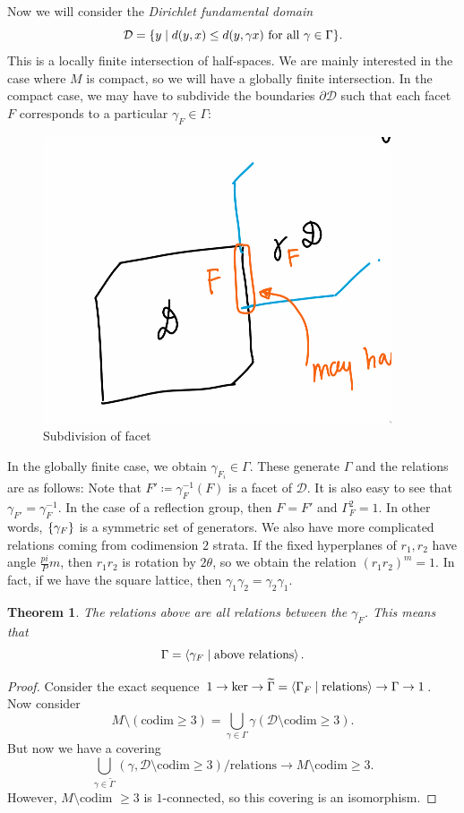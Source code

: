\documentclass[leqno, openany]{memoir}
\newtheorem{thm}{Theorem}[section]
\theoremstyle{definition}
\theoremstyle{remark}
\theoremstyle{plain}
\theoremstyle{definition}
\theoremstyle{remark}
\newcommand{\mc}[1]{\mathcal{#1}}
\newcommand{\wtl}[1]{\widetilde{#1}}
\begin{document}
Now we will consider the \textit{Dirichlet fundamental domain} \[ \mc{D} =
\qty{y \mid d(y,x) \leq d(y, \gamma x) \text{ for all } \gamma \in \Gamma}. \]
This is a locally finite intersection of half-spaces. We are mainly interested
in the case where $M$ is compact, so we will have a globally finite
intersection. In the compact case, we may have to subdivide the boundaries
$\partial \mc{D}$ such that each facet $F$ corresponds to a particular
$\gamma_F \in \Gamma$: \begin{figure}[H] \centering
    \includegraphics[scale=0.5]{fd_domain.png} \caption{Subdivision of facet}%
\label{fig:fd_domain} \end{figure} In the globally finite case, we obtain
$\gamma_{F_i} \in \Gamma$. These generate $\Gamma$ and the relations are as
follows: Note that $F' \coloneqq \gamma_F^{-1}(F)$ is a facet of $\mc{D}$. It
is also easy to see that $\gamma_{F'} = \gamma_F^{-1}$. In the case of a
reflection group, then $F = F'$ and $\Gamma_F^2 = 1$. In other words,
$\qty{\gamma_F}$ is a symmetric set of generators. We also have more
complicated relations coming from codimension $2$ strata. If the fixed
hyperplanes of $r_1, r_2$ have angle $\frac{pi}Pm$, then $r_1 r_2$ is rotation
by $2 \theta$, so we obtain the relation ${(r_1 r_2)}^m = 1$. In fact, if we
have the square lattice, then $\gamma_1 \gamma_2 = \gamma_2 \gamma_1$.

\begin{thm} The relations above are all relations between the $\gamma_F$. This
    means that \[ \Gamma = \ev{\gamma_F \mid \text{above relations}}. \]
\end{thm}

\begin{proof} Consider the exact sequence $1 \to \ker \to \wtl{\Gamma} =
    \ev{\Gamma_F \mid \text{relations}} \to \Gamma \to 1$. Now consider \[ M
    \setminus ( \text{codim}\geq 3 ) = \bigcup_{\gamma \in \Gamma}
\gamma(\mc{D} \setminus \text{codim} \geq 3). \] But now we have a covering \[
\bigcup_{\gamma \in \wtl{\Gamma}} (\gamma, \mc{D} \setminus \text{codim}\geq 3)
/ \text{relations} \to M \setminus \text{codim}\geq 3. \] However, $M \setminus
\text{codim }\geq 3$ is $1$-connected, so this covering is an isomorphism.
\end{proof}
\end{document}
